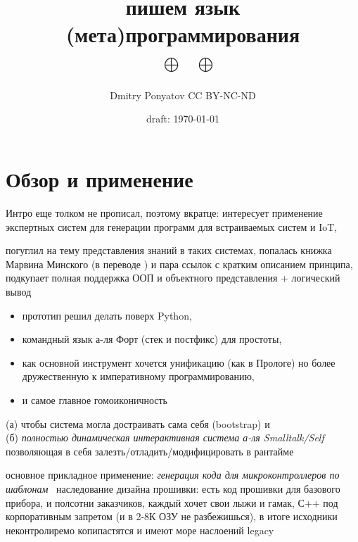

\author{Dmitry Ponyatov  CC BY-NC-ND}
\title{{\Huge \ \\\metal}\\пишем язык (мета)программирования\\
\py\ $\oplus$ \F\ $\oplus$ \prolog}
\date{draft: \today}



\maketitle
\tableofcontents



\part{Обзор и применение \metal}\secdown

Интро еще толком не прописал, поэтому вкратце:
интересует применение экспертных систем для генерации программ для встраиваемых
систем и IoT,

погуглил на тему представления знаний в таких системах, попалась
книжка Марвина Минского (в переводе \cite{minsky}) и пара ссылок с кратким
описанием принципа, подкупает полная поддержка ООП и объектного представления + логический вывод
\begin{itemize}[nosep]
  \item 
прототип решил делать поверх Python,
  \item 
командный язык а-ля Форт (стек и постфикс) для простоты,
  \item 
как основной инструмент хочется унификацию (как в Прологе) но более
дружественную к императивному программированию,
\clearpage
  \item 
и самое главное гомоиконичность\\
\end{itemize}
(а) чтобы система могла достраивать сама себя (bootstrap) и\\ 
(б) \emph{полностью динамическая интерактивная система а-ля Smalltalk/Self}\\
позволяющая в себя залезть/отладить/модифицировать в рантайме

\bigskip
\noindent
основное прикладное применение: \emph{генерация кода для микроконтроллеров по
шаблонам}\ 
наследование дизайна прошивки: есть код прошивки для базового прибора, и
полсотни заказчиков, каждый хочет свои лыжи и гамак, С++ под корпоративным
запретом (и в 2-8К ОЗУ не разбежишься), в итоге исходники неконтролиремо
копипастятся и имеют море наслоений legacy

